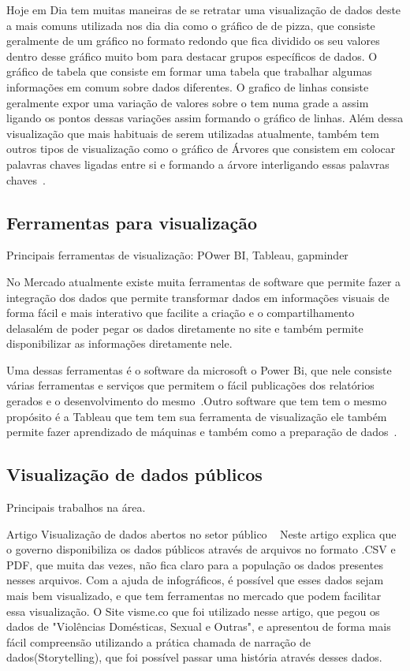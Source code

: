 Hoje em Dia tem muitas maneiras de se retratar uma visualização de dados deste a mais comuns utilizada nos dia dia como o gráfico de de pizza, que consiste geralmente de um gráfico no formato redondo que fica dividido os seu valores dentro desse gráfico muito bom para destacar grupos específicos de dados. O gráfico de tabela que consiste em formar uma tabela que trabalhar algumas informações em comum sobre dados diferentes. O grafico de linhas consiste geralmente expor uma variação de valores sobre o tem numa grade a assim ligando os pontos dessas variações assim formando o gráfico de linhas. Além dessa visualização que mais habituais de serem utilizadas atualmente, também tem outros tipos de visualização como o gráfico  de Árvores que consistem em colocar palavras chaves ligadas entre si e formando a árvore interligando essas palavras chaves~\cite{Bertolini:2009}. 


\subsection{\esp Ferramentas para visualização}

{\color{red} Principais ferramentas de visualização: POwer BI, Tableau, gapminder}

No Mercado atualmente existe muita ferramentas de software que permite fazer a integração dos dados que permite transformar dados em informações visuais de forma fácil e mais interativo que facilite a criação e o compartilhamento delasalém de poder pegar os dados diretamente no site e também permite disponibilizar as informações diretamente nele.

Uma dessas ferramentas é o software da microsoft o Power Bi, que nele consiste várias ferramentas e serviços que permitem o fácil publicações dos relatórios gerados e o desenvolvimento do mesmo~\cite{Microsoft}.Outro software que tem tem o mesmo propósito é a Tableau que tem tem sua ferramenta de visualização ele também permite fazer aprendizado de máquinas e também como a preparação de dados~\cite{TABLEAU}.



\subsection{\esp Visualização de dados públicos}
 
 {\color{red} Principais trabalhos na área. }
 
 Artigo Visualização de dados abertos no setor público ~\cite{Silva:2018} 
Neste artigo explica que o governo disponibiliza os dados públicos através de arquivos no formato .CSV e PDF, que muita das vezes, não fica claro para a população os dados presentes nesses arquivos. Com a ajuda de infográficos, é possível que esses dados sejam mais bem visualizado, e que tem ferramentas no mercado que podem facilitar essa visualização. O Site visme.co que foi utilizado nesse artigo, que pegou os dados de "Violências  Domésticas,  Sexual  e  Outras", e apresentou de forma mais fácil compreensão utilizando a prática chamada de narração de dados(Storytelling), que foi possível passar uma história através desses dados.
 

